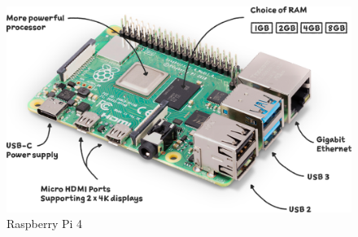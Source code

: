 \begin{figure} [H] \centering
  \includegraphics[scale=0.3]{gambar/raspberrypi4.png}
  \caption{Raspberry Pi 4 \parencite{raspberrypiltd_2023}}
  \label{fig:metodelogi}
\end{figure}




